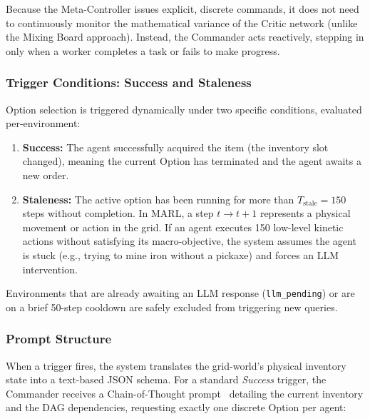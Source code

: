 Because the Meta-Controller issues explicit, discrete commands, it does not need to continuously monitor the mathematical variance of the Critic network (unlike the Mixing Board approach). Instead, the Commander acts reactively, stepping in only when a worker completes a task or fails to make progress.

\subsubsection{Trigger Conditions: Success and Staleness}

Option selection is triggered dynamically under two specific conditions, evaluated per-en\-vi\-ron\-ment:

\begin{enumerate}
    \item \textbf{Success:} The agent successfully acquired the item (the inventory slot changed), meaning the current Option has terminated and the agent awaits a new order.
    \item \textbf{Staleness:} The active option has been running for more than $T_{\text{stale}}=150$ steps without completion.
    In MARL, a step $t \to t{+}1$ represents a physical movement or action in the grid. If an agent executes 150 low-level kinetic actions without satisfying its macro-objective, the system assumes the agent is stuck (e.g., trying to mine iron without a pickaxe) and forces an LLM intervention.
\end{enumerate}

Environments that are already awaiting an LLM response (\texttt{llm\_pending}) or are on a brief 50-step cooldown are safely excluded from triggering new queries.

\subsubsection{Prompt Structure}

When a trigger fires, the system translates the grid-world's physical inventory state into a text-based JSON schema.
For a standard \emph{Success} trigger, the Commander receives a Chain-of-Thought prompt~\parencite{Wei_Wang_Schuurmans_Bosma_Ichter_Xia_Chi_Le_Zhou_2022} detailing the current inventory and the DAG dependencies, requesting exactly one discrete Option per agent:

